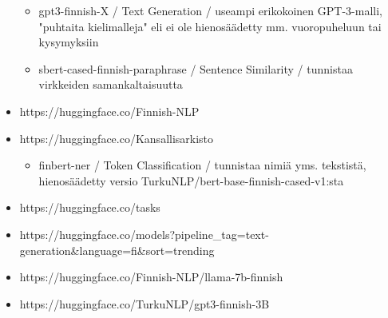 \begin{itemize}
\begin{itemize}
    \item gpt3-finnish-X / Text Generation / useampi erikokoinen GPT-3-malli, "puhtaita kielimalleja" eli ei ole hienosäädetty mm. vuoropuheluun tai kysymyksiin
    \item sbert-cased-finnish-paraphrase / Sentence Similarity / tunnistaa virkkeiden samankaltaisuutta
  \end{itemize}
  \item https://huggingface.co/Finnish-NLP
  \item https://huggingface.co/Kansallisarkisto
  \begin{itemize}
    \item finbert-ner / Token Classification / tunnistaa nimiä yms. tekstistä, hienosäädetty versio TurkuNLP/bert-base-finnish-cased-v1:sta
  \end{itemize}
  \item https://huggingface.co/tasks
  \item https://huggingface.co/models?pipeline\_tag=text-generation\&language=fi\&sort=trending
  \item https://huggingface.co/Finnish-NLP/llama-7b-finnish
  \item https://huggingface.co/TurkuNLP/gpt3-finnish-3B
\end{itemize}
